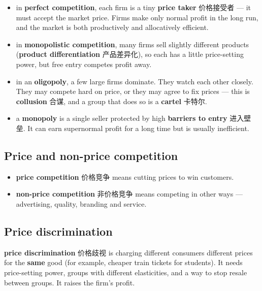 \documentclass[11pt]{article}
\begin{document}
\begin{itemize}
\item in \textbf{perfect competition}, each firm is a tiny \textbf{price taker} 价格接受者 — it must accept the market price. Firms make only normal profit in the long run, and the market is both productively and allocatively efficient.

\item in \textbf{monopolistic competition}, many firms sell slightly different products (\textbf{product differentiation} 产品差异化), so each has a little price-setting power, but free entry competes profit away.

\item in an \textbf{oligopoly}, a few large firms dominate. They watch each other closely. They may compete hard on price, or they may agree to fix prices — this is \textbf{collusion} 合谋, and a group that does so is a \textbf{cartel} 卡特尔.

\item a \textbf{monopoly} is a single seller protected by high \textbf{barriers to entry} 进入壁垒. It can earn supernormal profit for a long time but is usually inefficient.

\end{itemize}

\subsection*{Price and non-price competition}

\begin{itemize}
\item \textbf{price competition} 价格竞争 means cutting prices to win customers.

\item \textbf{non-price competition} 非价格竞争 means competing in other ways — advertising, quality, branding and service.

\end{itemize}

\subsection*{Price discrimination}

\textbf{price discrimination} 价格歧视 is charging different consumers different prices for the \textbf{same} good (for example, cheaper train tickets for students). It needs price-setting power, groups with different elasticities, and a way to stop resale between groups. It raises the firm's profit.
\end{document}
